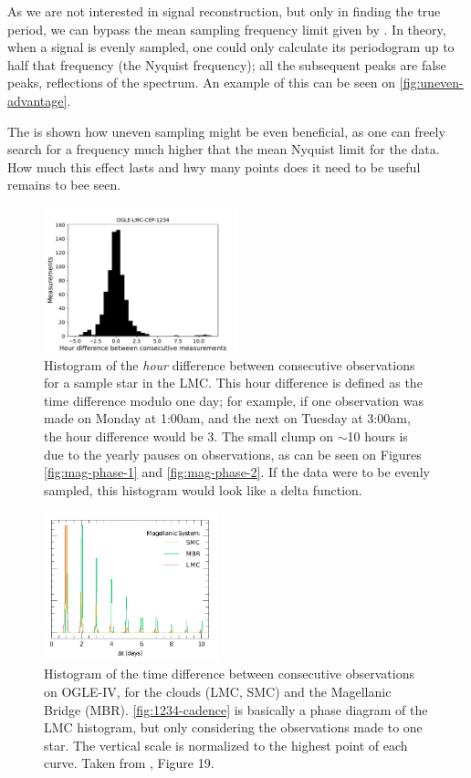 As we are not interested in signal reconstruction, but only in finding the true period,
we can bypass the mean sampling frequency limit given by \cite{Marvasti2001}.
In theory, when a signal is evenly sampled, one could only calculate its periodogram up to half that frequency (the Nyquist frequency);
all the subsequent peaks are false peaks, reflections of the spectrum. 
An example of this can be seen on \autoref{fig:uneven-advantage}.

The is shown how uneven sampling might be even beneficial, as one can freely search for a frequency much higher that 
the mean Nyquist limit for the data. How much this effect lasts and hwy many points does it need to be useful remains to bee seen.

\begin{figure}
	\centering
	\includegraphics[width=0.5\textwidth]{img/1234_cadence.pdf}
	\caption[Hourly difference between observations for OGLE-LMC-CEP-1234]{
		Histogram of the \textit{hour} difference between consecutive observations for a sample star in the LMC.
		This hour difference is defined as the time difference modulo one day; 
		for example, if one observation was made on Monday at 1:00am, and the next on Tuesday at 3:00am, the hour difference would be 3.
		The small clump on $\sim$10 hours is due to the yearly pauses on observations, as can be seen on Figures \ref{fig:mag-phase-1} and \ref{fig:mag-phase-2}.
		If the data were to be evenly sampled, this histogram would look like a delta function.
	}
	\label{fig:1234-cadence}
\end{figure}


\begin{figure}
	\centering
	\includegraphics[width=0.45\textwidth]{img/fig_19_65_1_1.pdf}
	\caption[OGLE-IV observation cadence in the Magellanic system]{
		Histogram of the time difference between consecutive observations on OGLE-IV, for the clouds (LMC, SMC) and the Magellanic Bridge (MBR).
		\autoref{fig:1234-cadence} is basically a phase diagram of the LMC histogram, 
		but only considering the observations made to one star.
		The vertical scale is normalized to the highest point of each curve.
		Taken from \cite{OGLE2015}, Figure 19.
	}
	\label{fig:global-cadence}
\end{figure}

